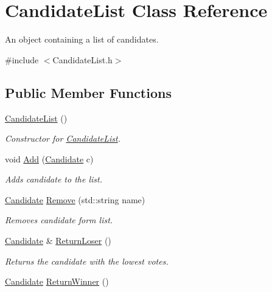 \hypertarget{class_candidate_list}{}\section{Candidate\+List Class Reference}
\label{class_candidate_list}


An object containing a list of candidates.  




{\ttfamily \#include $<$Candidate\+List.\+h$>$}

\subsection*{Public Member Functions}
\begin{DoxyCompactItemize}
\item 
\hyperlink{class_candidate_list_a93e59d3b7c8f9cfc11f85eda636cd96d}{Candidate\+List} ()\hypertarget{class_candidate_list_a93e59d3b7c8f9cfc11f85eda636cd96d}{}\label{class_candidate_list_a93e59d3b7c8f9cfc11f85eda636cd96d}

\begin{DoxyCompactList}\small\item\em Constructor for \hyperlink{class_candidate_list}{Candidate\+List}. \end{DoxyCompactList}\item 
void \hyperlink{class_candidate_list_a36a07e05ada013fdb02f5b81badc1cc3}{Add} (\hyperlink{class_candidate}{Candidate} c)
\begin{DoxyCompactList}\small\item\em Adds candidate to the list. \end{DoxyCompactList}\item 
\hyperlink{class_candidate}{Candidate} \hyperlink{class_candidate_list_a566cced2b1375525a5bc86686d0e4a7e}{Remove} (std\+::string name)
\begin{DoxyCompactList}\small\item\em Removes candidate form list. \end{DoxyCompactList}\item 
\hyperlink{class_candidate}{Candidate} \& \hyperlink{class_candidate_list_ab86e3029ea749dae3646c3c491e9a628}{Return\+Loser} ()\hypertarget{class_candidate_list_ab86e3029ea749dae3646c3c491e9a628}{}\label{class_candidate_list_ab86e3029ea749dae3646c3c491e9a628}

\begin{DoxyCompactList}\small\item\em Returns the candidate with the lowest votes. \end{DoxyCompactList}\item 
\hyperlink{class_candidate}{Candidate} \hyperlink{class_candidate_list_a3430f7e5c361bde4ae4f1cae3aee0c15}{Return\+Winner} ()\hypertarget{class_candidate_list_a3430f7e5c361bde4ae4f1cae3aee0c15}{}\label{class_candidate_list_a3430f7e5c361bde4ae4f1cae3aee0c15}


\end{DoxyCompactItemize}
